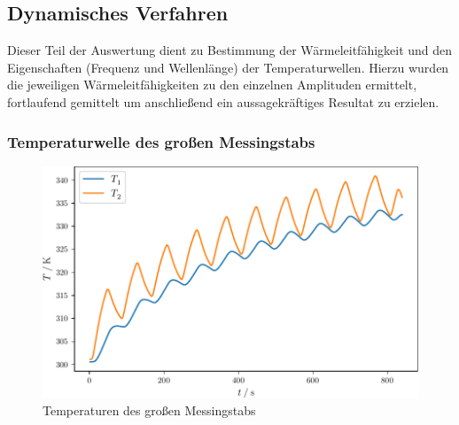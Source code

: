 \subsection{Dynamisches Verfahren}
Dieser Teil der Auswertung dient zu Bestimmung der Wärmeleitfähigkeit und den Eigenschaften (Frequenz und Wellenlänge) der Temperaturwellen.
Hierzu wurden die jeweiligen Wärmeleitfähigkeiten zu den einzelnen Amplituden ermittelt,
fortlaufend gemittelt um anschließend ein aussagekräftiges Resultat zu erzielen.
\subsubsection{Temperaturwelle des großen Messingstabs}
\begin{figure}
  \caption{Temperaturen des großen Messingstabs}
  \centering
  \includegraphics[width = \textwidth]{build/Me.pdf}
\end{figure}
